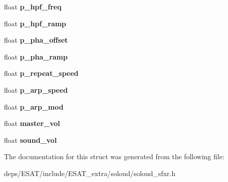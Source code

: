 \begin{DoxyCompactItemize}
float {\bfseries p\+\_\+hpf\+\_\+freq}
\item 
\mbox{\label{struct_so_loud_1_1_sfxr_params_ac6a93a91c96054caa661ca8a69849cd3}} 
float {\bfseries p\+\_\+hpf\+\_\+ramp}
\item 
\mbox{\label{struct_so_loud_1_1_sfxr_params_a77407eaea01a9729edd77601935ad630}} 
float {\bfseries p\+\_\+pha\+\_\+offset}
\item 
\mbox{\label{struct_so_loud_1_1_sfxr_params_aaa118d49465911a42896292d5dd9d38f}} 
float {\bfseries p\+\_\+pha\+\_\+ramp}
\item 
\mbox{\label{struct_so_loud_1_1_sfxr_params_a8e264eb463bb0d54278a7523e05f92c7}} 
float {\bfseries p\+\_\+repeat\+\_\+speed}
\item 
\mbox{\label{struct_so_loud_1_1_sfxr_params_a818682d30a2f7f185cd21d2e162dbad5}} 
float {\bfseries p\+\_\+arp\+\_\+speed}
\item 
\mbox{\label{struct_so_loud_1_1_sfxr_params_a0d98f475455a59d71a3aed2092a646e5}} 
float {\bfseries p\+\_\+arp\+\_\+mod}
\item 
\mbox{\label{struct_so_loud_1_1_sfxr_params_a914028741afd880475085953ae2872a3}} 
float {\bfseries master\+\_\+vol}
\item 
\mbox{\label{struct_so_loud_1_1_sfxr_params_aa0ed234579b29fa59b923f3ee0849761}} 
float {\bfseries sound\+\_\+vol}
\end{DoxyCompactItemize}


The documentation for this struct was generated from the following file\+:\begin{DoxyCompactItemize}
\item 
deps/\+E\+S\+A\+T/include/\+E\+S\+A\+T\+\_\+extra/soloud/soloud\+\_\+sfxr.\+h\end{DoxyCompactItemize}
